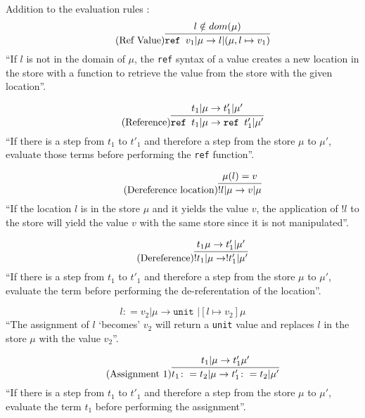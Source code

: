 Addition to the evaluation rules \cite{pierce2002ProgLang}:
\begin{equation*}
    \tag{Ref Value}
    \infer{
        \texttt{ref } v_1 | \mu \rightarrow l | (\mu, l \mapsto v_1)
    }{
        l \notin dom(\mu)
    }
\end{equation*}
``If $l$ is not in the domain of $\mu$, the \texttt{ref} syntax of a
value creates a new location in the store with a function to
retrieve the value from the store with the given location''.

\begin{equation*}
    \tag{Reference}
    \infer{
        \texttt{ref } t_1 | \mu \rightarrow \texttt{ref } t'_1 | \mu'
    }{
        t_1 | \mu \rightarrow t'_1 | \mu'
    }
\end{equation*}
``If there is a step from $t_1$ to $t'_1$ and therefore a step
from the store $\mu$ to $\mu'$, evaluate those terms before
performing the \texttt{ref} function''.

\begin{equation*}
    \tag{Dereference location}
    \infer{
        !l | \mu \rightarrow v | \mu
    }{
        \mu(l) = v
    }
\end{equation*}
``If the location $l$ is in the store $\mu$ and it yields the value $v$,
the application of $!l$ to the store will yield the value $v$ with the
same store since it is not manipulated''.

\begin{equation*}
    \tag{Dereference}
    \infer{
        !t_1 | \mu \rightarrow !t'_1 | \mu'
    }{
        t_1 \mu \rightarrow t'_1 | \mu'
    }
\end{equation*}
``If there is a step from $t_1$ to $t'_1$ and therefore a step
from the store $\mu$ to $\mu'$, evaluate the term before
performing the de-referentation of the location''.

\begin{equation*}
    \tag{Assignment}
    l \colon = v_2 | \mu \rightarrow \texttt{unit } | [l \mapsto v_2] \mu
\end{equation*}
``The assignment of $l$ `becomes' $v_2$ will return a \texttt{unit} value
and replaces $l$ in the store $\mu$ with the value $v_2$''.

\begin{equation*}
    \tag{Assignment 1}
    \infer{
        t_1 \colon = t_2 | \mu \rightarrow t'_1 \colon = t_2 | \mu'
    }{
        t_1 | \mu \rightarrow t'_1 \mu'
    }
\end{equation*}
``If there is a step from $t_1$ to $t'_1$ and therefore a step
from the store $\mu$ to $\mu'$, evaluate the term $t_1$ before
performing the assignment''.

